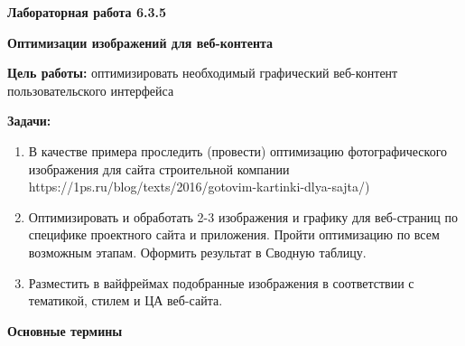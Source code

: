 
\graphicspath{ {6.3.5/models/} }

\pagestyle{fancy}
\fancyhead{}
\renewcommand{\headrulewidth}{0pt}


\begin{center}
    \textbf{Лабораторная работа 6.3.5}

    \textbf{Оптимизации изображений для веб-контента}
\end{center}

\textbf{Цель работы:} оптимизировать необходимый графический веб-контент пользовательского интерфейса
\bigskip

\textbf{Задачи:}

\begin{enumerate}
    \item В качестве примера проследить (провести) оптимизацию фотографического изображения для сайта строительной компании https://1ps.ru/blog/texts/2016/gotovim-kartinki-dlya-sajta/)
    \item Оптимизировать и обработать 2-3 изображения и графику для веб-страниц по специфике проектного сайта и приложения. Пройти оптимизацию по всем возможным этапам. Оформить результат в Сводную таблицу.
    \item Разместить в вайфреймах подобранные изображения в соответствии с тематикой, стилем и ЦА веб-сайта.
\end{enumerate}
\bigskip

\textbf{Основные термины}


